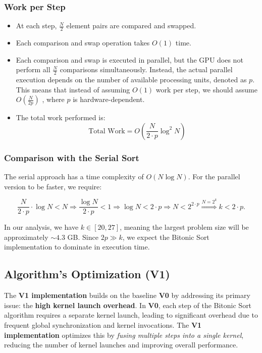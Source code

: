 \documentclass[12pt]{article}
\begin{document}
\subsubsection{Work per Step}
\begin{itemize}[nosep]
    \item At each step, \( \frac{N}{2} \) element pairs are compared and swapped.
    \item Each comparison and swap operation takes \( O(1) \) time.
    \item Each comparison and swap is executed in parallel, but the GPU does not perform all \( \frac{N}{2} \) comparisons simultaneously. Instead, the actual parallel execution depends on the number of available processing units, denoted as \( p \). This means that instead of assuming \( O(1) \) work per step, we should assume  \( O\left( \frac{N}{2p} \right) \) , where \( p \) is hardware-dependent.
    \item The total work performed is:
    \[
    \text{Total Work} = O\left(\frac{N}{2 \cdot p} \log^2 N \right)
    \]
\end{itemize}

\subsubsection{Comparison with the Serial Sort}

The serial approach has a time complexity of \( O(N \log N) \). For the parallel version to be faster, we require:

\[
\frac{N}{2 \cdot p} \cdot \log N < N \Rightarrow \frac{\log N}{2 \cdot p} < 1 \Rightarrow \log N < 2 \cdot p \Rightarrow N < 2^{2 \cdot p} \overset{N = 2^k}{\Longrightarrow} k < 2 \cdot p.
\]

In our analysis, we have \( k \in [20, 27] \), meaning the largest problem size will be approximately \( \sim 4.3 \) GB. Since \( 2p \gg k \), we expect the Bitonic Sort implementation to dominate in execution time.


\subsection{Algorithm's Optimization (V1)}

The \textbf{V1 implementation} builds on the baseline \textbf{V0} by addressing its primary issue: the \textbf{high kernel launch overhead}. In \textbf{V0}, each step of the Bitonic Sort algorithm requires a separate kernel launch, leading to significant overhead due to frequent global synchronization and kernel invocations. The \textbf{V1 implementation} optimizes this by \textit{fusing multiple steps into a single kernel}, reducing the number of kernel launches and improving overall performance.
\end{document}
